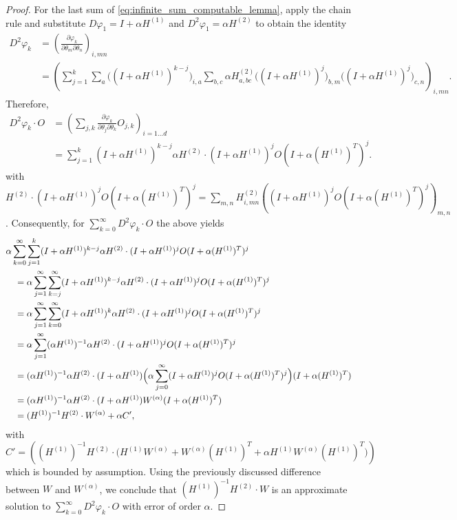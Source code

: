 \documentclass{article}
\begin{document}
\begin{proof}
    For the last sum of \eqref{eq:infinite_sum_computable_lemma}, apply the chain rule and substitute $D \varphi_1 = I + \alpha H^{(1)}$ and $D^2\varphi_1=\alpha H^{(2)}$ to obtain the identity
    \begin{align*}
        D^2\varphi_k 
        & = \left(\frac{\partial \varphi_k}{\partial \theta_m \partial \theta_n}\right)_{i,mn} \\
        & = \left(\sum_{j=1}^k \sum_{a} \bigl((I+\alpha H^{(1)})^{k-j}\bigr)_{i,a} \sum_{b,c} \alpha H^{(2)}_{a,bc} \bigl((I+\alpha H^{(1)})^{j}\bigr)_{b,m} \bigl((I+\alpha H^{(1)})^{j}\bigr)_{c,n} \right)_{i,mn}. 
    \end{align*}
    Therefore, 
    \begin{align*}
    D^2\varphi_k \cdot O & = (\sum_{j,k} \frac{\partial \varphi_k}{\partial \theta_j \partial \theta_k} O_{j,k})_{i=1...d} \\
    & = \sum_{j=1}^{k} (I+\alpha H^{(1)})^{k-j} \alpha  H^{(2)} \cdot (I+\alpha H^{(1)})^{j} O (I+\alpha (H^{(1)})^T)^{j}.
    \end{align*} 
    with $H^{(2)} \cdot (I+\alpha H^{(1)})^{j} O (I+\alpha (H^{(1)})^T)^{j} = \sum_{m,n} H^{(2)}_{i,mn} \left((I+\alpha H^{(1)})^{j} O (I+\alpha (H^{(1)})^T)^{j}\right)_{m,n}$.
    Consequently, for $\sum_{k=0}^\infty D^2\varphi_k \cdot O$ the above yields
    { \allowdisplaybreaks
    \begin{align*}
        & \alpha\sum_{k=0}^\infty \sum_{j=1}^k (I+\alpha H^{(1)})^{k-j} \alpha H^{(2)} \cdot (I+\alpha H^{(1)})^{j} O (I+\alpha (H^{(1)})^T)^{j} \\
        & \quad = \alpha\sum_{j=1}^\infty \sum_{k=j}^\infty (I+\alpha H^{(1)})^{k-j} \alpha H^{(2)} \cdot (I+\alpha H^{(1)})^{j} O (I+\alpha (H^{(1)})^T)^{j} \\
        & \quad = \alpha\sum_{j=1}^\infty \sum_{k=0}^\infty (I+\alpha H^{(1)})^{k} \alpha H^{(2)} \cdot (I+\alpha H^{(1)})^{j} O (I+\alpha (H^{(1)})^T)^{j} \\
        & \quad = \alpha\sum_{j=1}^\infty (\alpha H^{(1)})^{-1} \alpha H^{(2)} \cdot (I+\alpha H^{(1)})^{j} O (I+\alpha (H^{(1)})^T)^{j} \\
        & \quad =  ( \alpha H^{(1)})^{-1} \alpha H^{(2)} \cdot (I+\alpha H^{(1)}) \Bigl( \alpha\sum_{j=0}^\infty (I+\alpha H^{(1)})^{j} O (I+\alpha (H^{(1)})^T)^{j} \Bigr) (I+\alpha (H^{(1)})^T)\\
        & \quad =  ( \alpha H^{(1)})^{-1} \alpha H^{(2)} \cdot (I+\alpha H^{(1)}) W^{(\alpha)} (I+\alpha (H^{(1)})^T)\\
        & \quad = (H^{(1)})^{-1} H^{(2)} \cdot W^{(\alpha)} + \alpha C',
        \end{align*}
    with $C' = \left( (H^{(1)})^{-1} H^{(2)} \cdot \bigl(H^{(1)} W^{(\alpha)} + W^{(\alpha)} (H^{(1)})^T + \alpha H^{(1)} W^{(\alpha)}(H^{(1)})^T\bigr) \right)$ which is bounded by assumption.} Using the previously discussed difference between $W$ and $W^{(\alpha)}$, we conclude that $(H^{(1)})^{-1} H^{(2)} \cdot W$ is an approximate solution to $\sum_{k=0}^\infty D^2\varphi_k \cdot O$ with error of order $\alpha$. 
\end{proof}
\end{document}
